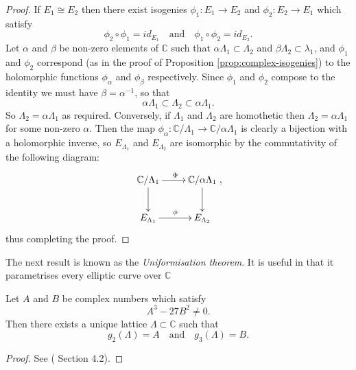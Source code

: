 \begin{proof}
   If $E_{1} \cong E_{2}$ then there exist isogenies $\phi_{1} : E_{1} \rightarrow
   E_{2}$ and $\phi_{2} : E_{2} \rightarrow E_{1}$ which satisfy
   \begin{equation*}
     \phi_{2} \circ \phi_{1} = id_{E_{1}} \quad \text{and} \quad \phi_{1} \circ
     \phi_{2} = id_{E_{2}}.
   \end{equation*}
   Let $\alpha$ and $\beta$ be non-zero elements of $\mathbb{C}$ such that $\alpha
   \Lambda_{1} \subset \Lambda_{2}$ and $\beta \Lambda_{2} \subset \lambda_{1}$, and
   $\phi_{1}$ and $\phi_{2}$ correspond (as in the proof of Proposition
   \ref{prop:complex-isogenies}) to the holomorphic functions $\phi_{\alpha}$ and
   $\phi_{\beta}$ respectively.  Since $\phi_{1}$ and $\phi_{2}$ compose to the
   identity we must have $\beta = \alpha^{-1}$, so that
   \begin{equation*}
     \alpha \Lambda_{1} \subset \Lambda_{2} \subset \alpha \Lambda_{1}.
   \end{equation*}
   So $\Lambda_{2} = \alpha \Lambda_{1}$ as required.  Conversely, if $\Lambda_{1}$
   and $\Lambda_{2}$ are homothetic then $\Lambda_{2} = \alpha \Lambda_{1}$ for some
   non-zero $\alpha$.  Then the map $\phi_{\alpha} : \mathbb{C} / \Lambda_{1}
   \rightarrow \mathbb{C} / \alpha \Lambda_{1}$ is clearly a bijection with a
   holomorphic inverse, so $E_{\Lambda_{1}}$ and $E_{\Lambda_{2}}$ are isomorphic by
   the commutativity of the following diagram:
   \begin{equation*}
     \xymatrix{
       \mathbb{C} / \Lambda_{1} \ar[d] \ar[r]^{\Phi} & \mathbb{C} / \alpha \Lambda_{1} \ar[d]\\
       E_{\Lambda_{1}} \ar[r]^{\phi }& E_{\Lambda_{2}}
     },
   \end{equation*}
   thus completing the proof.
 \end{proof}

 The next result is known as the \emph{Uniformisation theorem}.  It is useful in that
 it parametrises every elliptic curve over $\mathbb{C}$

 \begin{thm}
   \label{thm:uniformisation-theorem}
   Let $A$ and $B$ be complex numbers which satisfy
   \begin{equation*}
     A^{3} - 27B^{2} \neq 0.
   \end{equation*}
   Then there exists a unique lattice $\Lambda \subset \mathbb{C}$ such that
   \begin{equation*}
     g_{2}(\Lambda) = A \quad \text{and} \quad g_{3}(\Lambda) = B.
   \end{equation*}
 \end{thm}
 \begin{proof}
  See (\cite{shimura94} Section 4.2).
 \end{proof}

